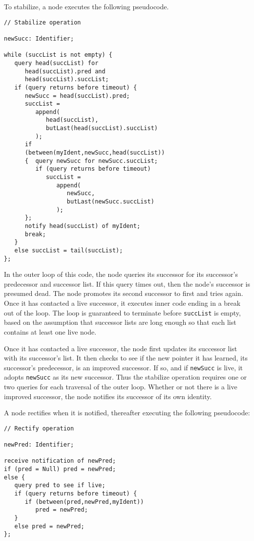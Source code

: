 \documentclass[conference]{IEEEtran}
\begin{document}
To stabilize, a node executes the following pseudocode.
\small
\begin{verbatim}
// Stabilize operation

newSucc: Identifier;

while (succList is not empty) {
   query head(succList) for 
      head(succList).pred and
      head(succList).succList;
   if (query returns before timeout) {
      newSucc = head(succList).pred;
      succList =
         append(
            head(succList),
            butLast(head(succList).succList)
         );
      if 
      (between(myIdent,newSucc,head(succList))
      {  query newSucc for newSucc.succList;
         if (query returns before timeout) 
            succList =
               append(
                  newSucc,
                  butLast(newSucc.succList)
               );
      };
      notify head(succList) of myIdent;
      break;
   }
   else succList = tail(succList);
};
\end{verbatim}
\normalsize
In the outer loop of this code, the
node queries its successor for its successor's predecessor and
successor list.
If this query times out, then the node's successor is presumed dead.
The node promotes its second successor to first and tries again.
Once it has contacted a live successor, it executes inner code ending
in a break out of the loop.
The loop is guaranteed to terminate before
\small
{\tt succList}
\normalsize
is empty,
based on the assumption that
successor lists are long enough so that each list contains at least one
live node.

Once it has contacted a live successor, the node first updates
its successor list with its successor's list.
It then checks to see if the new pointer it has learned, its successor's
predecessor, is an improved successor.
If so, and if
\small
{\tt newSucc}
\normalsize
is live, it adopts
\small
{\tt newSucc}
\normalsize
as its new successor.
Thus the stabilize operation requires one or two queries for each
traversal of the outer loop.
Whether or not there is a live improved successor, the node notifies
its successor of its own identity.

A node rectifies when it is notified, thereafter executing the following
pseudocode:
\small
\begin{verbatim}
// Rectify operation

newPred: Identifier;

receive notification of newPred;
if (pred = Null) pred = newPred;
else {
   query pred to see if live;
   if (query returns before timeout) {
      if (between(pred,newPred,myIdent))
         pred = newPred;
   }
   else pred = newPred;
};
\end{verbatim}
\normalsize
\end{document}
